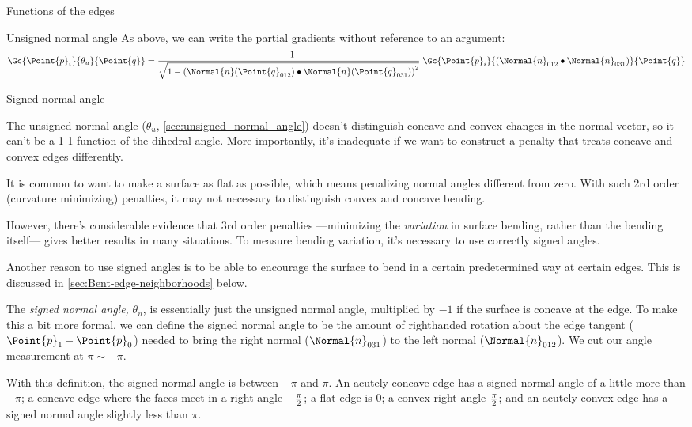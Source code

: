 \begin{plSection}{Functions of the edges}
\begin{plSection}{Unsigned normal angle}
As above, we can write the partial gradients without reference to an argument:
\begin{equation}
\Gc{\Point{p}_i}{\theta_u}{\Point{q}}
=
{ -1 \over \sqrt{1 - \left( \Normal{n}(\Point{q}_{012}) \bullet \Normal{n}(\Point{q}_{031}) \right)^2} }
\; \Gc{\Point{p}_i}{\left(\Normal{n}_{012}\bullet\Normal{n}_{031}\right)}{\Point{q}}
\end{equation}

\end{plSection}%

\begin{plSection}{Signed normal angle}
\label{sec:signed_normal_angle}

The unsigned normal angle
($\theta_u$, \autoref{sec:unsigned_normal_angle})
doesn't distinguish concave and convex changes in the normal vector,
so it can't be a 1-1 function of the dihedral angle.
More importantly, it's inadequate if we want to construct
a penalty that treats concave and convex edges differently.

It is common to want to make a surface as flat as possible,
which means penalizing normal angles different from zero.
With such 2rd order (curvature minimizing) penalties, 
it may not necessary to distinguish
convex and concave bending.

However, there's considerable evidence that
$3$rd order penalties ---minimizing the {\it variation}
in surface bending, rather than the bending itself---
gives better results in many situations.
To measure bending variation, it's necessary
to use correctly signed angles.

Another reason to use signed angles is to be able
to encourage the surface to bend in a certain
predetermined way at certain edges.
This is discussed in \autoref{sec:Bent-edge-neighborhoods}
below.

The {\it signed normal angle,} $\theta_n$,
is essentially just the
unsigned normal angle, multiplied by $-1$ if the surface is
concave at the edge.
To make this a bit more formal,
we can define the signed normal angle to be the amount
of righthanded rotation about the edge tangent ($\Point{p}_1 - \Point{p}_0$)
needed to bring the right normal ($\Normal{n}_{031}$) to
the left normal ($\Normal{n}_{012}$).
We cut our angle measurement at $\pi \sim -\pi$.

With this definition, the signed normal angle
is between $-\pi$ and $\pi$.
An acutely concave edge has a signed normal angle
of a little more than $-\pi$;
a concave edge where the faces meet in a right angle
$-{\pi \over 2}$;
a flat edge is $0$;
a convex right angle $\pi \over 2$;
and an acutely convex edge has a signed normal angle
slightly less than $\pi$.


\end{plSection}
\end{plSection}
